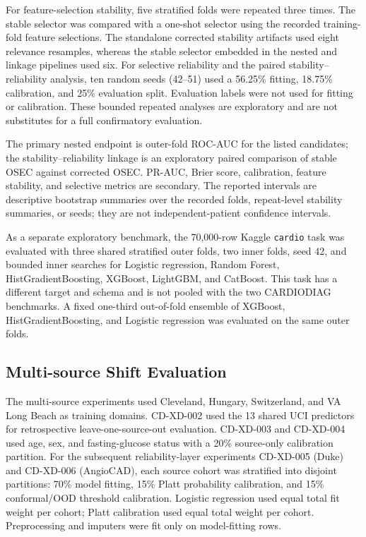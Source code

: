\documentclass[12pt]{article}
\begin{document}
For feature-selection stability, five stratified folds were repeated three
times. The stable selector was compared with a one-shot selector using the
recorded training-fold feature selections. The standalone corrected stability artifacts used eight relevance resamples,
whereas the stable selector embedded in the nested and linkage pipelines used
six. For selective reliability and the paired stability--reliability analysis,
ten random seeds (42--51) used a 56.25\%
fitting, 18.75\% calibration, and 25\% evaluation split. Evaluation labels were
not used for fitting or calibration. These bounded repeated analyses are
exploratory and are not substitutes for a full confirmatory evaluation.

The primary nested endpoint is outer-fold ROC-AUC for the listed candidates;
the stability--reliability linkage is an exploratory paired comparison of
stable OSEC against corrected OSEC. PR-AUC, Brier score, calibration,
feature stability, and selective metrics are secondary. The reported intervals
are descriptive bootstrap summaries over the recorded folds, repeat-level
stability summaries, or seeds; they are not independent-patient confidence
intervals.

As a separate exploratory benchmark, the 70,000-row Kaggle \texttt{cardio}
task was evaluated with three shared stratified outer folds, two inner folds,
seed 42, and bounded inner searches for Logistic regression, Random Forest,
HistGradientBoosting, XGBoost, LightGBM, and CatBoost. This task has a
different target and schema and is not pooled with the two CARDIODIAG
benchmarks. A fixed one-third out-of-fold ensemble of XGBoost,
HistGradientBoosting, and Logistic regression was evaluated on the same outer
folds.

\subsection{Multi-source Shift Evaluation}
The multi-source experiments used Cleveland, Hungary, Switzerland, and VA Long
Beach as training domains. CD-XD-002 used the 13 shared UCI predictors for
retrospective leave-one-source-out evaluation. CD-XD-003 and CD-XD-004 used
age, sex, and fasting-glucose status with a 20\% source-only calibration
partition. For the subsequent reliability-layer experiments CD-XD-005
(Duke) and CD-XD-006 (AngioCAD), each source cohort was stratified into
disjoint partitions: 70\% model fitting, 15\% Platt probability calibration,
and 15\% conformal/OOD threshold calibration. Logistic regression used equal
total fit weight per cohort; Platt calibration used equal total weight per
cohort. Preprocessing and imputers were fit only on model-fitting rows.
\end{document}
